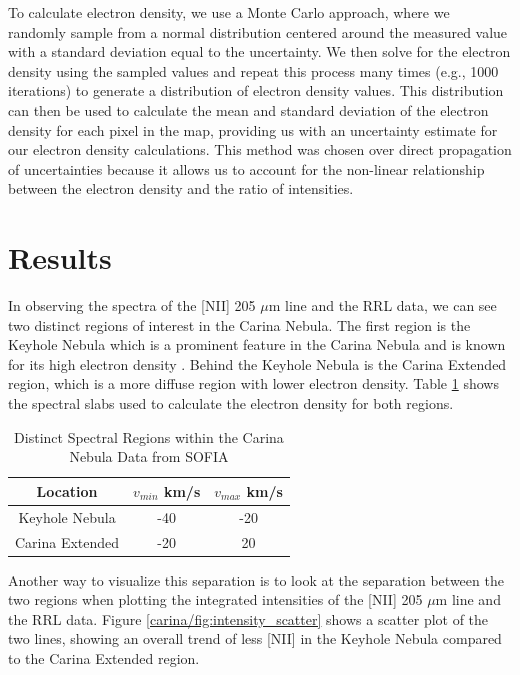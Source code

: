 To calculate electron density, we use a Monte Carlo approach, where we randomly sample from a normal distribution centered around the measured value with a standard deviation equal to the uncertainty.
We then solve for the electron density using the sampled values and repeat this process many times (e.g., 1000 iterations) to generate a distribution of electron density values.
This distribution can then be used to calculate the mean and standard deviation of the electron density for each pixel in the map, providing us with an uncertainty estimate for our electron density calculations.
This method was chosen over direct propagation of uncertainties because it allows us to account for the non-linear relationship between the electron density and the ratio of intensities.

\section{Results}
In observing the spectra of the [NII] 205 $\mu$m line and the RRL data, we can see two distinct regions of interest in the Carina Nebula.
The first region is the Keyhole Nebula which is a prominent feature in the Carina Nebula and is known for its high electron density \cite{brooks2000unlocking}.
Behind the Keyhole Nebula is the Carina Extended region, which is a more diffuse region with lower electron density.
Table \ref{carina/tab:slabs} shows the spectral slabs used to calculate the electron density for both regions.

\begin{table}
    \centering
    \begin{tabular}{|c|c|c|}
        \hline
        Location & $v_{min}$ km/s & $v_{max}$ km/s \\
        \hline
        Keyhole Nebula & -40 & -20 \\
        Carina Extended & -20 & 20 \\
        \hline
    \end{tabular}
    \caption{Distinct Spectral Regions within the Carina Nebula Data from SOFIA}
    \label{carina/tab:slabs}
\end{table}

Another way to visualize this separation is to look at the separation between the two regions when plotting the integrated intensities of the [NII] 205 $\mu$m line and the RRL data.
Figure \ref{carina/fig:intensity_scatter} shows a scatter plot of the two lines, showing an overall trend of less [NII] in the Keyhole Nebula compared to the Carina Extended region.

